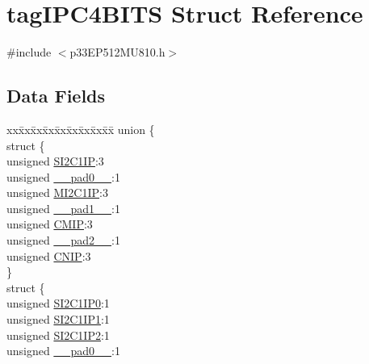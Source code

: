 \hypertarget{structtag_i_p_c4_b_i_t_s}{}\section{tag\+I\+P\+C4\+B\+I\+TS Struct Reference}
\label{structtag_i_p_c4_b_i_t_s}


{\ttfamily \#include $<$p33\+E\+P512\+M\+U810.\+h$>$}

\subsection*{Data Fields}
\begin{DoxyCompactItemize}
\item 
\begin{tabbing}
xx\=xx\=xx\=xx\=xx\=xx\=xx\=xx\=xx\=\kill
union \{\\
\>struct \{\\
\>\>unsigned \hyperlink{structtag_i_p_c4_b_i_t_s_a99942102907a624999d2de6b73e28dc4}{SI2C1IP}:3\\
\>\>unsigned \hyperlink{structtag_i_p_c4_b_i_t_s_adf71f3d8410c1f1dbbc96680a92c49af}{\_\_pad0\_\_}:1\\
\>\>unsigned \hyperlink{structtag_i_p_c4_b_i_t_s_a07322a10196c660fb86765626dfeb069}{MI2C1IP}:3\\
\>\>unsigned \hyperlink{structtag_i_p_c4_b_i_t_s_acaf2d0924a107ec6e8d2e31febaf66f9}{\_\_pad1\_\_}:1\\
\>\>unsigned \hyperlink{structtag_i_p_c4_b_i_t_s_aa8ee3d17a5a19c4d69285da5a18d1044}{CMIP}:3\\
\>\>unsigned \hyperlink{structtag_i_p_c4_b_i_t_s_a4d97cc5f7d51d22fc2bf3eab35c9cb7f}{\_\_pad2\_\_}:1\\
\>\>unsigned \hyperlink{structtag_i_p_c4_b_i_t_s_a57e859ed8b65eef1e13c7fbae3375f6c}{CNIP}:3\\
\>\} \\
\>struct \{\\
\>\>unsigned \hyperlink{structtag_i_p_c4_b_i_t_s_a19d324caa8900502b0c0ee9398f3fc6b}{SI2C1IP0}:1\\
\>\>unsigned \hyperlink{structtag_i_p_c4_b_i_t_s_a4578654082bf8b245c5bb692907f146b}{SI2C1IP1}:1\\
\>\>unsigned \hyperlink{structtag_i_p_c4_b_i_t_s_a14aa717bb6b0ff307a918373f3e667b2}{SI2C1IP2}:1\\
\>\>unsigned \hyperlink{structtag_i_p_c4_b_i_t_s_adf71f3d8410c1f1dbbc96680a92c49af}{\_\_pad0\_\_}:1\\

\end{tabbing}
\end{DoxyCompactItemize}
